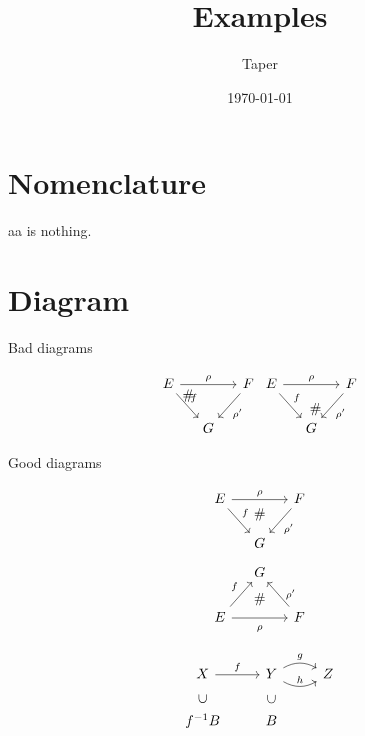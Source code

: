 \documentclass{article}
\title{Examples}
\date{\today}
\author{Taper}
\begin{document}
\maketitle
{}
\tableofcontents
\section{Nomenclature}

aa is nothing.


\label{here shows a label}

\section{Diagram}

\begin{center}
    Bad diagrams
\end{center}
$$
    \begin{tikzcd}[column sep=small]
        E \ar[dr,"f"]\ar[rr,"\rho"]\ar[drr, phantom, "\#", very near
        start] & & F\ar[dl,"\rho'"] \\
        & G &  \,
    \end{tikzcd}
    \begin{tikzcd}[column sep=small]
        E \ar[dr,"f"]\ar[rr,"\rho"]\ar[drr, phantom, "\#"] & & F\ar[dl,"\rho'"] \\
        & G &  \,
    \end{tikzcd}
$$
\begin{center}
    Good diagrams
\end{center}
$$
    \begin{tikzcd}[column sep=small]
        E \ar[dr,"f"]\ar[rr,"\rho"] &
        \ar[d,phantom, "\#", near start] & F\ar[dl,"\rho'"] \\
        & G &  \,
    \end{tikzcd}
$$
$$ \begin{tikzcd}[column sep=small]
& G &  \, \\
E \ar[ur,"f"]\ar[rr,"\rho" below=3] &
\ar[u,phantom, "\#"] 
& F\ar[ul,"\rho'" right=3]
\end{tikzcd} $$

$$ \begin{tikzcd}[]
X\ar[r,"f"] & Y \ar[r,"g",bend left]\ar[r,"h",bend right]
& Z \\
f^{-1}B\ar[u,phantom,"\subset"
{anchor=south,rotate=90,left=0,near end}]
&
B\ar[u,phantom,"\subset" {anchor=south,rotate=90,left=0,near
      	end}] & \, 
\end{tikzcd}$$
\end{document}
